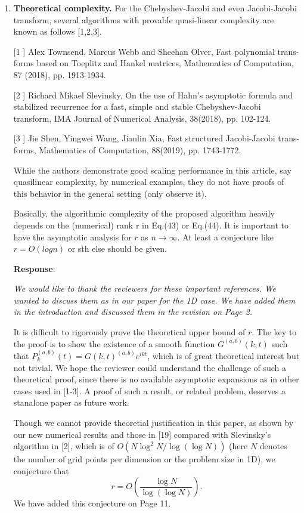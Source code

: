 \documentclass[11pt]{article}
\newcommand{\Response}{{\bf Response}}
\begin{document}
\begin{enumerate}
\item \textbf{Theoretical complexity.} For the Chebyshev-Jacobi and even Jacobi-Jacobi transform, several algorithms with provable quasi-linear complexity are known as follows [1,2,3].

[1 ] Alex Townsend, Marcus Webb and Sheehan Olver, Fast polynomial trans- forms based on Toeplitz and Hankel matrices, Mathematics of Computation, 87 (2018), pp. 1913-1934.

[2 ] Richard Mikael Slevinsky, On the use of Hahn’s asymptotic formula and stabilized recurrence for a fast, simple and stable Chebyshev-Jacobi transform, IMA Journal of Numerical Analysis, 38(2018), pp. 102-124.

[3 ] Jie Shen, Yingwei Wang, Jianlin Xia, Fast structured Jacobi-Jacobi trans- forms, Mathematics of Computation, 88(2019), pp. 1743-1772.

While the authors demonstrate good scaling performance in this article, say quasilinear complexity, by numerical examples, they do not have proofs of this behavior
in the general setting (only observe it).

Basically, the algorithmic complexity of the proposed algorithm heavily depends on
the (numerical) rank r in Eq.(43) or Eq.(44). It is important to have the asymptotic
analysis for $r$ as $n \rightarrow \infty$. At least a conjecture like $r = O(log n)$ or sth else should be given.

\Response: {\it We would like to thank the reviewers for these important references. We wanted to discuss them as in our paper for the 1D case. We have added them in the introduction and discussed them in the revision on Page 2.

It is difficult to rigorously prove the theoretical upper bound of $r$. The key to the proof is to show the existence of a smooth function $G^{(a,b)}(k,t)$ such that $P_k^{(a,b)}(t)=G(k,t)^{(a,b)}e^{ikt}$, which is of great theoretical interest but not trivial. We hope the reviewer could understand the challenge of such a theoretical proof, since there is no available asymptotic expansions as in other cases used in [1-3]. A proof of such a result, or related problem, deserves a stanalone paper as future work.

Though we cannot provide theoretial justification in this paper, as shown by our new numerical results and those in [19] compared with Slevinsky's algorithm in [2], which is of $O(N \log^2 N/\log(\log N))$ (here $N$ denotes the number of grid points per dimension or the problem size in 1D), we conjecture that 
\begin{equation}
r = O(\dfrac{\log N}{\log(\log N)}).
\end{equation}
We have added this conjecture on Page 11.

}
\end{enumerate}
\end{document}
